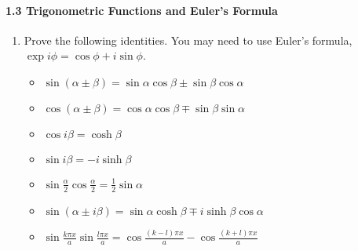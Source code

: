 \documentclass{chem6155problemset}
\begin{document}
\paragraph{1.3 Trigonometric Functions and Euler's Formula}
\begin{enumerate}[resume]

\item Prove the following identities. You may need to use Euler's formula, $\exp i\phi = \cos\phi + i \sin\phi$.
	\begin{itemize}
		\item $\sin(\alpha\pm\beta) = \sin\alpha\cos\beta \pm \sin\beta\cos\alpha$
    \item $\cos(\alpha\pm\beta) = \cos\alpha\cos\beta \mp \sin\beta\sin\alpha$
		\item $\cos i\beta = \cosh\beta$
		\item $\sin i\beta = -i \sinh\beta$
		\item $\sin\frac{\alpha}{2}\cos\frac\alpha{2} = \frac{1}{2}\sin\alpha$
		\item $\sin(\alpha\pm i\beta) = \sin\alpha\cosh\beta \mp i \sinh\beta\cos\alpha$
		\item $\sin\frac{k\pi x}{a}\sin\frac{l\pi x}{a} = \cos\frac{(k-l)\pi x}{a} - \cos\frac{(k+l)\pi x}{a}$
	\end{itemize}

\end{enumerate}
\end{document}
